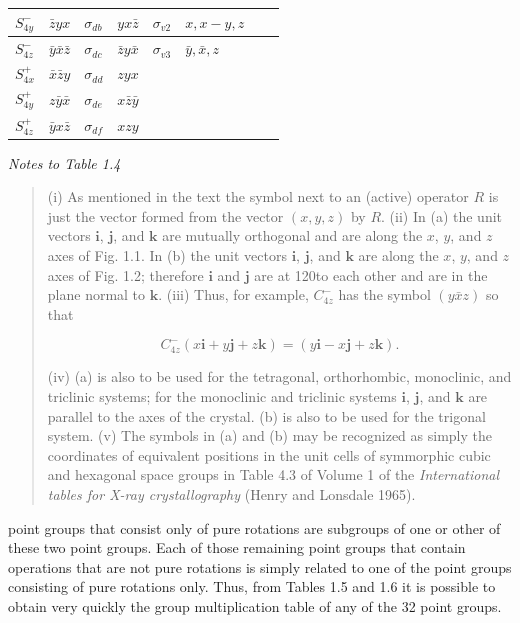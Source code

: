 \documentclass[11pt,a4paper,twoside,openright]{book}
\begin{document}
\begin{minipage}{\textwidth}
{\begin{tabular}{|l|l|l|l|l|l|l|l|}
$S_{4y}^{-}$ & $\bar{z}yx$ & $\sigma_{db}$ & $yx\bar{z}$ & $\sigma_{v2}$ & $x, x-y, z$ &  &  \\ \hline
$S_{4z}^{-}$ & $\bar{y}\bar{x}\bar{z}$ & $\sigma_{dc}$ & $\bar{z}y\bar{x}$ & $\sigma_{v3}$ & $\bar{y}, \bar{x}, z$ &  &  \\ \hline
$S_{4x}^{+}$ & $\bar{x}\bar{z}y$ & $\sigma_{dd}$ & $zyx$ &  &  &  &  \\ \hline
$S_{4y}^{+}$ & $z\bar{y}\bar{x}$ & $\sigma_{de}$ & $x\bar{z}\bar{y}$ &  &  &  &  \\ \hline
$S_{4z}^{+}$ & $\bar{y}x\bar{z}$ & $\sigma_{df}$ & $xzy$ &  &  &  &  \\ \hline
\end{tabular}
}
\end{minipage}
\medskip

\textit{Notes to Table 1.4}

\begin{quote}(i) As mentioned in the text the symbol next to an (active) operator $R$ is just the vector formed from the vector $(x, y, z)$ by $R$. (ii) In (a) the unit vectors $\mathbf{i}$, $\mathbf{j}$, and $\mathbf{k}$ are mutually orthogonal and are along the $x$, $y$, and $z$ axes of Fig. 1.1. In (b) the unit vectors $\mathbf{i}$, $\mathbf{j}$, and $\mathbf{k}$ are along the $x$, $y$, and $z$ axes of Fig. 1.2; therefore $\mathbf{i}$ and $\mathbf{j}$ are at 120\textdegree  to each other and are in the plane normal to $\mathbf{k}$. (iii) Thus, for example, $C_{4z}^{-}$ has the symbol $(y\bar{x}z)$  so that

\begin{equation*}
C_{4z}^{-}(x\mathbf{i} + y\mathbf{j} + z\mathbf{k}) = (y\mathbf{i} - x\mathbf{j} + z\mathbf{k}).
\end{equation*}

(iv) (a) is also to be used for the tetragonal, orthorhombic, monoclinic, and triclinic systems; for the monoclinic and triclinic systems $\mathbf{i}$, $\mathbf{j}$, and $\mathbf{k}$ are parallel to the axes of the crystal. (b) is also to be used for the trigonal system. (v) The symbols in (a) and (b) may be recognized as simply the coordinates of equivalent positions in the unit cells of symmorphic cubic and hexagonal space groups in Table 4.3 of Volume 1 of the \textit{International tables for X-ray crystallography} (Henry and Lonsdale 1965).\end{quote}

point groups that consist only of pure rotations are subgroups of one or other of these two point groups. Each of those remaining point groups that contain operations that are not pure rotations is simply related to one of the point groups consisting of pure rotations only. Thus, from Tables 1.5 and 1.6 it is possible to obtain very quickly the group multiplication table of any of the 32 point groups.
\end{document}
